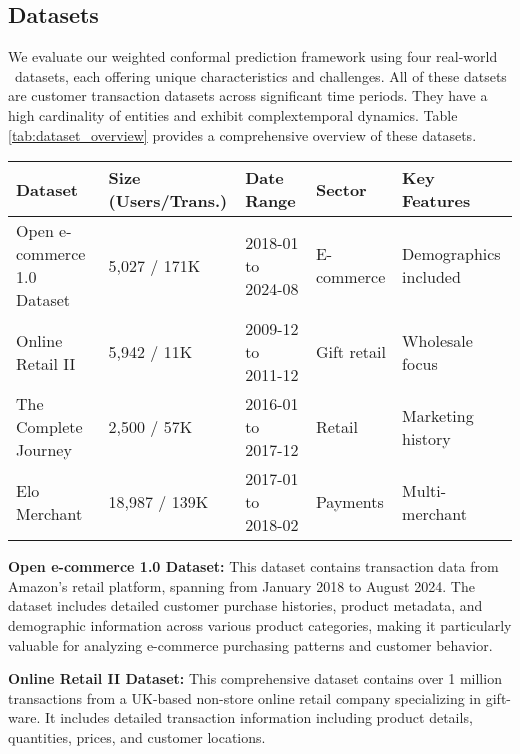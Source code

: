 
\subsection{Datasets}

We evaluate our weighted conformal prediction framework using four real-world \ datasets, each offering unique characteristics and challenges. All of these datsets are customer transaction datasets across significant time periods. They have a high cardinality of entities and exhibit complextemporal dynamics.
Table \ref{tab:dataset_overview} provides a comprehensive overview of these datasets.

\begin{table*}[t]
\centering
\caption{Overview of Datasets Used in Experiments}
\label{tab:dataset_overview}
\begin{tabular}{lllll}
\hline
\textbf{Dataset} & \textbf{Size (Users/Trans.)} & \textbf{Date Range} & \textbf{Sector} & \textbf{Key Features} \\
\hline
Open e-commerce 1.0 Dataset \cite{berke2023open} & 5,027 / 171K & 2018-01 to 2024-08 & E-commerce & Demographics included \\
Online Retail II \cite{chen2012online} & 5,942 / 11K & 2009-12 to 2011-12 & Gift retail & Wholesale focus \\
The Complete Journey \cite{dunnhumby2014complete} & 2,500 / 57K & 2016-01 to 2017-12 & Retail & Marketing history \\
Elo Merchant \cite{elo2019merchant} & 18,987 / 139K & 2017-01 to 2018-02 & Payments & Multi-merchant \\
\hline
\end{tabular}
\end{table*}

\textbf{Open e-commerce 1.0 Dataset:} This dataset \cite{berke2023open} contains transaction data from Amazon's retail platform, spanning from January 2018 to August 2024. The dataset includes detailed customer purchase histories, product metadata, and demographic information across various product categories, making it particularly valuable for analyzing e-commerce purchasing patterns and customer behavior.

\textbf{Online Retail II Dataset:} This comprehensive dataset \cite{chen2012online} contains over 1 million transactions from a UK-based non-store online retail company specializing in gift-ware. It includes detailed transaction information including product details, quantities, prices, and customer locations.

